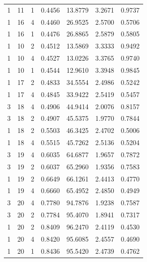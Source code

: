 \begin{tabular}{rrrrrrr}
1 & 11 & 1 & 0.4456 & 13.8779 & 3.2671 & 0.9737 \\
1 & 16 & 4 & 0.4460 & 26.9525 & 2.5700 & 0.5706 \\
1 & 16 & 1 & 0.4476 & 26.8865 & 2.5879 & 0.5805 \\
1 & 10 & 2 & 0.4512 & 13.5869 & 3.3333 & 0.9492 \\
1 & 10 & 4 & 0.4527 & 13.0226 & 3.3765 & 0.9740 \\
1 & 10 & 1 & 0.4544 & 12.9610 & 3.3948 & 0.9845 \\
1 & 17 & 2 & 0.4833 & 34.5554 & 2.4986 & 0.5242 \\
1 & 17 & 4 & 0.4845 & 33.9422 & 2.5419 & 0.5457 \\
3 & 18 & 4 & 0.4906 & 44.9414 & 2.0076 & 0.8157 \\
3 & 18 & 2 & 0.4907 & 45.5375 & 1.9770 & 0.7844 \\
1 & 18 & 2 & 0.5503 & 46.3425 & 2.4702 & 0.5006 \\
1 & 18 & 4 & 0.5515 & 45.7262 & 2.5136 & 0.5204 \\
3 & 19 & 4 & 0.6035 & 64.6877 & 1.9657 & 0.7872 \\
3 & 19 & 2 & 0.6037 & 65.2960 & 1.9356 & 0.7583 \\
1 & 19 & 2 & 0.6649 & 66.1261 & 2.4413 & 0.4770 \\
1 & 19 & 4 & 0.6660 & 65.4952 & 2.4850 & 0.4949 \\
3 & 20 & 4 & 0.7780 & 94.7876 & 1.9238 & 0.7587 \\
3 & 20 & 2 & 0.7784 & 95.4070 & 1.8941 & 0.7317 \\
1 & 20 & 2 & 0.8409 & 96.2470 & 2.4119 & 0.4530 \\
1 & 20 & 4 & 0.8420 & 95.6085 & 2.4557 & 0.4690 \\
1 & 20 & 1 & 0.8436 & 95.5420 & 2.4739 & 0.4762 \\
\bottomrule
\end{tabular}
